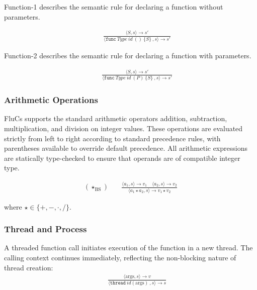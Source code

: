 \noindent Function-1 describes the semantic rule for declaring a function without parameters.

\begin{align*}
[\text{FuncDecl-1}] \quad
& \frac{
  \langle S, s \rangle \rightarrow s'
}{
  \langle \texttt{func}\ Type\ id\ ()\ \{S\}\ , s \rangle \rightarrow s'
}
\end{align*}

\noindent Function-2 describes the semantic rule for declaring a function with parameters.

\begin{align*}
[\text{FuncDecl-2}] \quad
& \frac{
  \langle S, s \rangle \rightarrow s'
}{
  \langle \texttt{func}\ Type\ id\ (P)\ \{S\}\ , s \rangle \rightarrow s'
}
\end{align*}

\subsubsection{Arithmetic Operations}

FluCs supports the standard arithmetic operators addition, subtraction, multiplication, and division on integer values. These operations are evaluated strictly from left to right according to standard precedence rules, with parentheses available to override default precedence. All arithmetic expressions are statically type-checked to ensure that operands are of compatible integer type.

\begin{align*}
(\star_{\text{BS}}) \quad
&\frac{
  \langle a_1, s \rangle \rightarrow v_1 \quad \langle a_2, s \rangle \rightarrow v_2
}{
  \langle a_1 \star a_2, s \rangle \rightarrow v_1 \star v_2
}
\end{align*}

where \(\star \in \{+, -, \cdot, /\}\).

\subsubsection{Thread and Process}

A threaded function call initiates execution of the function in a new thread. The calling context continues immediately, reflecting the non-blocking nature of thread creation:
\begin{align*}
[\text{ThreadCall}] \quad
& \frac{
  \langle \text{args}, s \rangle \rightarrow v
}{
  \langle \texttt{thread}\ id(\text{args}) \ , s \rangle \rightarrow s
}
\end{align*}

